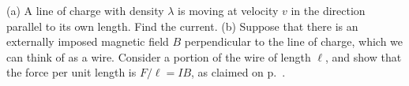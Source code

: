 (a) A line of charge with density $\lambda$ is moving at velocity $v$
in the direction parallel to its own length. Find the
current.\hwendpart
(b) Suppose that there is an externally imposed
magnetic field $B$ perpendicular to the line of charge, which we
can think of as a wire.  Consider a portion of
the wire of length $\ell$, and show that the force per unit length is
$F/\ell=IB$, as claimed on
p.~\pageref{b-force-on-wire-claim}.
